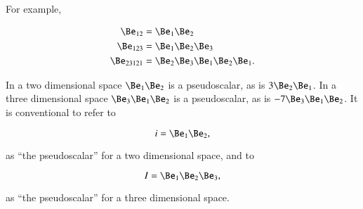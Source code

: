 For example,

\begin{equation}\label{eqn:multivector:360}
\begin{aligned}
\Be_{12} &= \Be_1 \Be_2 \\
\Be_{123} &= \Be_1 \Be_2 \Be_3 \\
\Be_{23121} &= \Be_2 \Be_3 \Be_1 \Be_2 \Be_1.
\end{aligned}
\end{equation}


In a two dimensional space \( \Be_1 \Be_2 \) is a pseudoscalar, as is \( 3 \Be_2 \Be_1 \).  In a three dimensional space
\( \Be_3 \Be_1 \Be_2 \) is a pseudoscalar, as is \( - 7 \Be_3 \Be_1 \Be_2 \).
It is conventional to refer to

\begin{dmath}\label{eqn:definitions:320}
i = \Be_1 \Be_2,
\end{dmath}

as ``the pseudoscalar'' for a two dimensional space, and to

\begin{dmath}\label{eqn:definitions:340}
I = \Be_1 \Be_2 \Be_3,
\end{dmath}

as ``the pseudoscalar'' for a three dimensional space.


